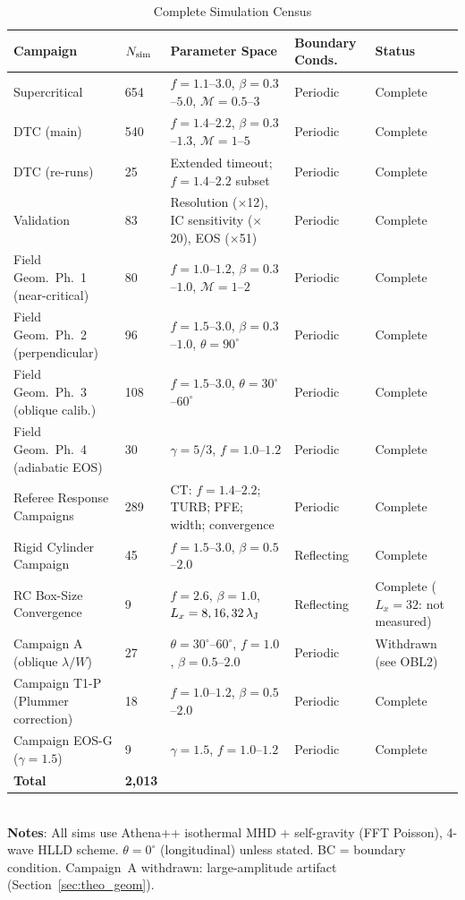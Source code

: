 \documentclass[twoside,twocolumn]{mnras}
\begin{document}
\begin{table}
\caption{Complete Simulation Census}
\label{tab:sim_census}
\small
\begin{tabular}{lllll}
\toprule
Campaign & $N_{\rm sim}$ & Parameter Space & Boundary Conds.\ & Status \\
\midrule
Supercritical & 654 & $f=1.1$--$3.0$, $\beta=0.3$--$5.0$, $\mathcal{M}=0.5$--$3$ & Periodic & Complete \\
DTC (main) & 540 & $f=1.4$--$2.2$, $\beta=0.3$--$1.3$, $\mathcal{M}=1$--$5$ & Periodic & Complete \\
DTC (re-runs) & 25 & Extended timeout; $f=1.4$--$2.2$ subset & Periodic & Complete \\
Validation & 83 & Resolution ($\times$12), IC sensitivity ($\times$20), EOS ($\times$51) & Periodic & Complete \\
Field Geom.\ Ph.\ 1 (near-critical) & 80 & $f=1.0$--$1.2$, $\beta=0.3$--$1.0$, $\mathcal{M}=1$--$2$ & Periodic & Complete \\
Field Geom.\ Ph.\ 2 (perpendicular) & 96 & $f=1.5$--$3.0$, $\beta=0.3$--$1.0$, $\theta=90^\circ$ & Periodic & Complete \\
Field Geom.\ Ph.\ 3 (oblique calib.) & 108 & $f=1.5$--$3.0$, $\theta=30^\circ$--$60^\circ$ & Periodic & Complete \\
Field Geom.\ Ph.\ 4 (adiabatic EOS) & 30 & $\gamma=5/3$, $f=1.0$--$1.2$ & Periodic & Complete \\
Referee Response Campaigns & 289 & CT: $f=1.4$--$2.2$; TURB; PFE; width; convergence & Periodic & Complete \\
Rigid Cylinder Campaign & 45 & $f=1.5$--$3.0$, $\beta=0.5$--$2.0$ & Reflecting & Complete \\
RC Box-Size Convergence & 9 & $f=2.6$, $\beta=1.0$, $L_x=8,16,32\,\lambda_{\rm J}$ & Reflecting & Complete ($L_x=32$: not measured) \\
Campaign A (oblique $\lambda/W$) & 27 & $\theta=30^\circ$--$60^\circ$, $f=1.0$, $\beta=0.5$--$2.0$ & Periodic & Withdrawn (see OBL2) \\
Campaign T1-P (Plummer correction) & 18 & $f=1.0$--$1.2$, $\beta=0.5$--$2.0$ & Periodic & Complete \\
Campaign EOS-G ($\gamma=1.5$) & 9 & $\gamma=1.5$, $f=1.0$--$1.2$ & Periodic & Complete \\
\midrule
\textbf{Total} & \textbf{2,013} & & & \\
\bottomrule
\end{tabular}
\\[2pt]
\footnotesize \textbf{Notes}: All sims use Athena++ isothermal MHD + self-gravity (FFT Poisson), 4-wave HLLD scheme. $\theta=0^\circ$ (longitudinal) unless stated. BC = boundary condition. Campaign~A withdrawn: large-amplitude artifact (Section~\ref{sec:theo_geom}).
\end{table}
\end{document}
